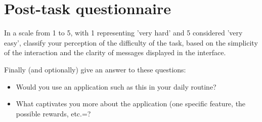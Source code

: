 \section{Post-task questionnaire}

In a scale from 1 to 5, with 1 representing 'very hard' and 5 considered 'very easy', classify your perception of the difficulty of the task, based on the simplicity of the interaction and the clarity of messages displayed in the interface.

Finally (and optionally) give an answer to these questions:

\begin{itemize}
\item Would you use an application such as this in your daily routine?
\item What captivates you more about the application (one specific feature, the possible rewards, etc.=?
\end{itemize}